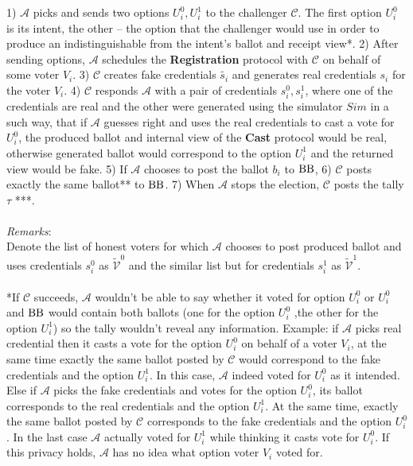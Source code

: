  1)  $\mathcal{A}$ picks and sends two options $U_i^0,U_i^1$ to the challenger $\mathcal{C}$. The first option $U_i^0$ is its intent, the other -- the option that the challenger would use in order to produce an indistinguishable from the intent's ballot and receipt view*. 2) After sending options, $\mathcal{A}$ schedules the   \textbf{Registration} protocol with $\mathcal{C}$ on behalf of some voter $V_i$. 3) $\mathcal{C}$ creates fake credentials $\tilde{s_i}$ and generates real credentials $s_i$ for the voter $V_i$. 4) $\mathcal{C}$ responds $\mathcal{A}$ with a pair of credentials $s_i^0,s_i^1$, where one of the credentials are real and the other were generated using the simulator $Sim$ in a such way, that if $\mathcal{A}$ guesses right and uses the real credentials to cast a vote for $U_i^0$, the produced ballot and internal view of the \textbf{Cast} protocol would be real, otherwise generated ballot would correspond to the option $U_i^1$ and the returned view would be fake. 5) If $\mathcal{A}$ chooses to post the ballot $b_i$ to $\operatorname{BB}$, 6) $\mathcal{C}$  posts exactly the same ballot** to $\operatorname{BB}$. 7) When $\mathcal{A}$ stops the election, $\mathcal{C}$ posts the tally $\tau$ ***. \\\\
\textit{Remarks}:\\
Denote the list of honest voters for which $\mathcal{A}$ chooses to post produced ballot and uses credentials $s_i^0$  as $ \tilde{\mathcal{V}}^0$ and the similar list but for credentials $s_i^1$ as $ \tilde{\mathcal{V}}^1$. \\\\
*If  $\mathcal{C}$ succeeds, $\mathcal{A}$ wouldn't be able to say whether it voted for option $U_i^0$ or $U_i^0$ and $\operatorname{BB}$ would contain both ballots (one for the option $U_i^0$ ,the other for the option $U_i^1$) so the tally wouldn't reveal any information. Example: if $\mathcal{A}$  picks real credential then it casts a vote for the option  $U_i^0$ on behalf of a voter $V_i$, at the same time exactly the same ballot posted by $\mathcal{C}$ would correspond to the fake credentials and the option $U_i^1$. In this case, $\mathcal{A}$ indeed voted for $U_i^0$ as it intended. Else if $\mathcal{A}$ picks the fake credentials and votes for the option $U_i^0$,  its ballot corresponds to the real credentials and  the option $U_i^1$. At the same time, exactly the same ballot posted by $\mathcal{C}$ corresponds to the fake credentials  and the option $U_i^0$. In the last case $\mathcal{A}$ actually voted for $U_i^1$ while thinking it casts vote for $U_i^0$. If this privacy holds,  $\mathcal{A}$ has no idea what option voter $V_i$ voted for. \\\\
